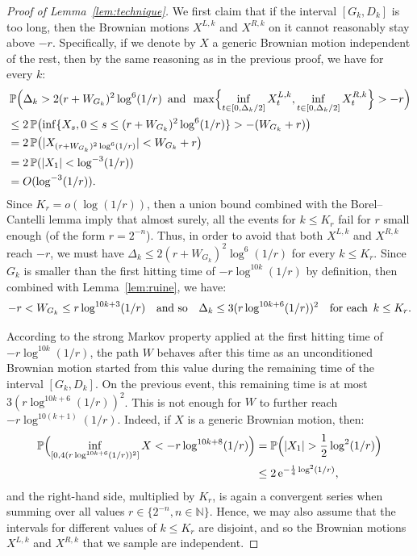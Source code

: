 \documentclass[british, a4paper,11pt]{article}
\numberwithin{equation}{section}
\theoremstyle{definition}
\renewcommand{\P}{\mathop{}\!\mathbb{P}}
\newcommand{\N}{\mathbb{N}}
\newcommand{\e}{\operatorname{e}}
\begin{document}
\begin{proof}[Proof of Lemma~\ref{lem:technique}]
We first claim that if the interval $[G_k,D_k]$ is too long, then the Brownian motions $X^{L,k}$ and $X^{R,k}$ on it cannot reasonably stay above $-r$. Specifically, if we denote by $X$ a generic Brownian motion independent of the rest, then by the same reasoning as in the previous proof, we have for every $k$:
\begin{align*}
&\P\Bigl(\Delta_k > 2(r+W_{G_k})^2 \log^6(1/r) \enskip\text{and}\enskip \max\Bigl\{\inf_{t \in [0,\Delta_k/2]} X^{L,k}_t, \inf_{t \in [0,\Delta_k/2]} X^{R,k}_t\Bigr\} > -r \Bigr)
\\
&\leq 2 \P\bigl(\inf\{X_s , 0 \leq s \leq (r+W_{G_k})^2 \log^6(1/r)\} > -(W_{G_k}+r) \bigr)
\\
&= 2 \P\bigl(|X_{(r+W_{G_k})^2 \log^6(1/r)}| < W_{G_k}+r \bigr)
\\
&= 2 \P(|X_1| < \log^{-3}(1/r) )
\\
&= O(\log^{-3}(1/r))
.\end{align*}
Since $K_r = o(\log(1/r))$, then a union bound combined with the Borel--Cantelli lemma imply that almost surely, all the events for $k \leq K_r$ fail for $r$ small enough (of the form $r=2^{-n}$).
Thus, in order to avoid that both $X^{L,k}$ and $X^{R,k}$ reach $-r$, we must have $\Delta_k \leq 2(r+W_{G_k})^2 \log^6(1/r)$ for every $k \leq K_r$. 
Since $G_k$ is smaller than the first hitting time of $-r \log^{10k}(1/r)$ by definition, then combined with Lemma~\ref{lem:ruine}, we have:
\[-r < W_{G_k} \leq r \log^{10k+3}(1/r)
\quad\text{and so}\quad
\Delta_k \leq 3(r \log^{10k+6}(1/r))^2 \quad\text{for each}\enskip k \leq K_r.\]

According to the strong Markov property applied at the first hitting time of $-r \log^{10k}(1/r)$, the path $W$ behaves after this time as an unconditioned Brownian motion started from this value during the remaining time of the interval $[G_k,D_k]$.
On the previous event, this remaining time is at most $3(r \log^{10k+6}(1/r))^2$.
This is not enough for $W$ to further reach $-r \log^{10(k+1)}(1/r)$. Indeed, if $X$ is a generic Brownian motion, then:
\begin{align*}
\P\Bigl(\inf_{[0,4(r \log^{10k+6}(1/r))^2]} X < -r \log^{10k+8}(1/r)\Bigr)
&= \P\Bigl(|X_1| > \frac{1}{2} \log^{2}(1/r)\Bigr)
\\
&\leq 2 \e^{- \frac{1}{4} \log^{2}(1/r)}
,\end{align*}
and the right-hand side, multiplied by $K_r$, is again a convergent series when summing over all values $r \in \{2^{-n}, n \in \N\}$.
Hence, we may also assume that the intervals for different values of $k \leq K_r$ are disjoint, and so the Brownian motions $X^{L,k}$ and $X^{R,k}$ that we sample are independent.


\end{proof}
\end{document}
